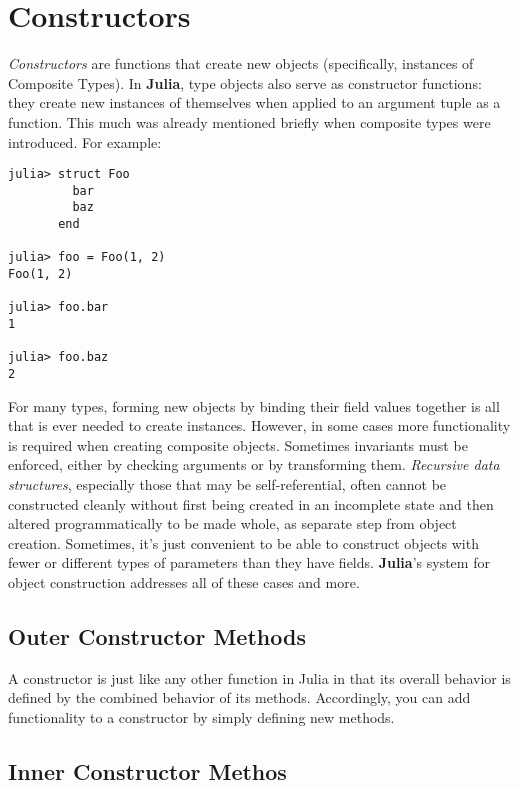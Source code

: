 \documentclass[
]{article}
\begin{document}
\newpage

\hypertarget{constructors}{%
\section{Constructors}\label{constructors}}

\emph{Constructors} are functions that create new objects (specifically,
instances of Composite Types). In \textbf{Julia}, type objects also
serve as constructor functions: they create new instances of themselves
when applied to an argument tuple as a function. This much was already
mentioned briefly when composite types were introduced. For example:

\begin{verbatim}
julia> struct Foo
         bar
         baz
       end

julia> foo = Foo(1, 2)
Foo(1, 2)

julia> foo.bar
1

julia> foo.baz
2
\end{verbatim}

For many types, forming new objects by binding their field values
together is all that is ever needed to create instances. However, in
some cases more functionality is required when creating composite
objects. Sometimes invariants must be enforced, either by checking
arguments or by transforming them. \emph{Recursive data structures},
especially those that may be self-referential, often cannot be
constructed cleanly without first being created in an incomplete state
and then altered programmatically to be made whole, as separate step
from object creation. Sometimes, it's just convenient to be able to
construct objects with fewer or different types of parameters than they
have fields. \textbf{Julia}'s system for object construction addresses
all of these cases and more.

\hypertarget{outer-constructor-methods}{%
\subsection{Outer Constructor Methods}\label{outer-constructor-methods}}

A constructor is just like any other function in Julia in that its
overall behavior is defined by the combined behavior of its methods.
Accordingly, you can add functionality to a constructor by simply
defining new methods.

\hypertarget{inner-constructor-methos}{%
\subsection{Inner Constructor Methos}\label{inner-constructor-methos}}
\end{document}
